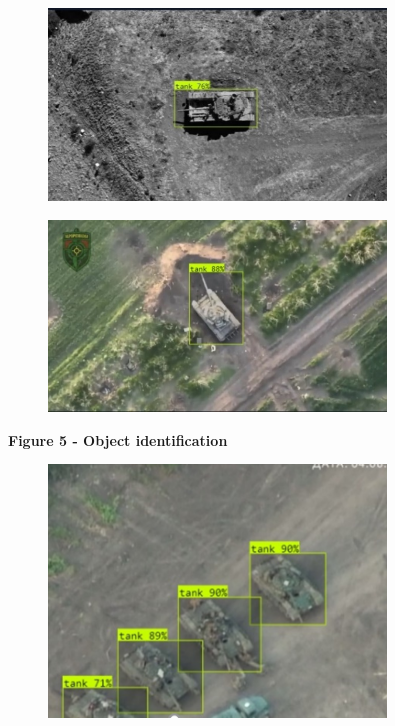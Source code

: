 \begin{figure}[H]
	\centering
	\includegraphics[width=0.8\textwidth]{assets/17}
	\caption*{}
\end{figure}\begin{figure}[H]
	\centering
	\includegraphics[width=0.8\textwidth]{assets/18}
	\caption*{}
\end{figure}

\textbf{Figure 5 - Object identification}

\begin{figure}[H]
	\centering
	\includegraphics[width=0.8\textwidth]{assets/19}
	\caption*{}
\end{figure}

